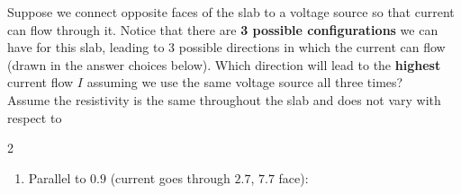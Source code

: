 \begin{enumerate}
Suppose we connect opposite faces of the slab to a voltage source so that current can flow through it. Notice that there are \textbf{3 possible configurations} we can have for this slab, leading to 3 possible directions in which the current can flow (drawn in the answer choices below). Which direction will lead to the \textbf{highest} current flow $I$ assuming we use the same voltage source all three times? 
\\
Assume the resistivity is the same throughout the slab and does not vary with respect to \newpage
\begin{multicols}{2}
  \begin{enumerate}
  	\setlength\itemsep{2cm}
\item Parallel to $0.9$ (current goes through $2.7$, $7.7$ face): \\
\begin{minipage}{0.5\linewidth}
    \begin{center}
    \end{center}
  \end{minipage}


\end{enumerate}
\end{multicols}
\end{enumerate}
